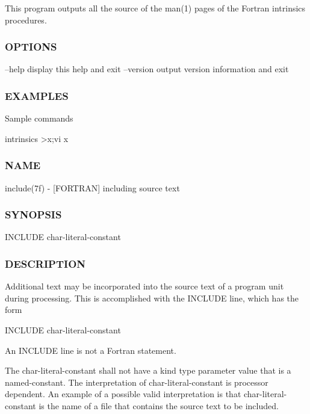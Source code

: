 This program outputs all the source of the man(1) pages of the Fortran intrinsics procedures.

\subsubsection*{O\+P\+T\+I\+O\+NS}

--help display this help and exit --version output version information and exit

\subsubsection*{E\+X\+A\+M\+P\+L\+ES}

\begin{DoxyVerb} Sample commands

    intrinsics >x;vi x \end{DoxyVerb}


\subsubsection*{N\+A\+ME}

include(7f) -\/ \mbox{[}F\+O\+R\+T\+R\+AN\mbox{]} including source text \subsubsection*{S\+Y\+N\+O\+P\+S\+IS}

\begin{DoxyVerb} INCLUDE char-literal-constant
\end{DoxyVerb}
 \subsubsection*{D\+E\+S\+C\+R\+I\+P\+T\+I\+ON}

Additional text may be incorporated into the source text of a program unit during processing. This is accomplished with the I\+N\+C\+L\+U\+DE line, which has the form \begin{DoxyVerb}   INCLUDE char-literal-constant
\end{DoxyVerb}


An I\+N\+C\+L\+U\+DE line is not a Fortran statement.

The char-\/literal-\/constant shall not have a kind type parameter value that is a named-\/constant. The interpretation of char-\/literal-\/constant is processor dependent. An example of a possible valid interpretation is that char-\/literal-\/constant is the name of a file that contains the source text to be included.

